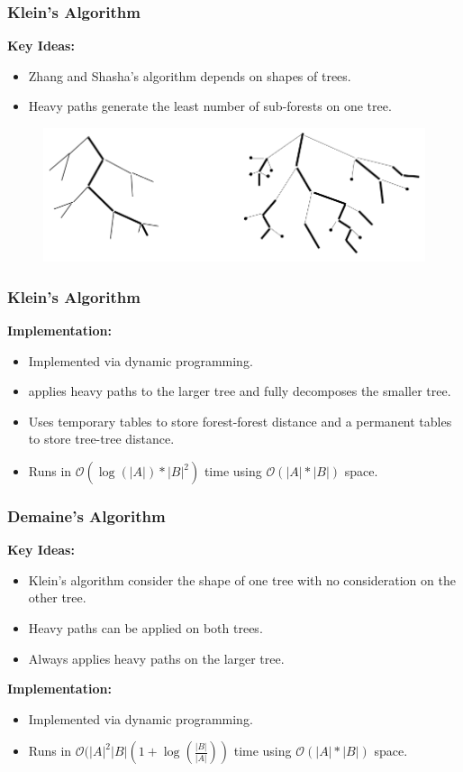 \documentclass{beamer}
\begin{document}
\begin{frame}
\frametitle{Klein's Algorithm}
\textbf{Key Ideas:}
\begin{itemize}
\item Zhang and Shasha's algorithm depends on shapes of trees.
\item Heavy paths generate the least number of sub-forests on one tree.
\end{itemize}
\begin{figure}
	\includegraphics[width=0.8\linewidth]{HeavyPaths}
	\centering
\end{figure}
\end{frame}
\begin{frame}
\frametitle{Klein's Algorithm}
\textbf{Implementation:}
\begin{itemize}
\item Implemented via dynamic programming.
\item applies heavy paths to the larger tree and fully decomposes the smaller tree.
\item Uses temporary tables to store forest-forest distance and a permanent tables to store tree-tree distance.
\item Runs in $\mathcal{O}(\log(\left\vert A \right\vert) * \left\vert B \right\vert^2)$ time using $\mathcal{O}(\left\vert A \right\vert * \left\vert B \right\vert)$ space.
\end{itemize}
\end{frame}
\begin{frame}
\frametitle{Demaine's Algorithm}
\textbf{Key Ideas:}
\begin{itemize}
\item Klein's algorithm consider the shape of one tree with no consideration on the other tree.
\item Heavy paths can be applied on both trees. 
\item Always applies heavy paths on the larger tree. 
\end{itemize}
\textbf{Implementation:}
\begin{itemize}
\item Implemented via dynamic programming.
\item Runs in $\mathcal{O}(\left\vert A \right\vert ^2 \left\vert B \right\vert(1 + \log(\frac{\left\vert B \right\vert}{\left\vert A \right\vert}))$ time using $\mathcal{O}(\left\vert A \right\vert * \left\vert B \right\vert)$ space.
\end{itemize}
\end{frame}
\end{document}
